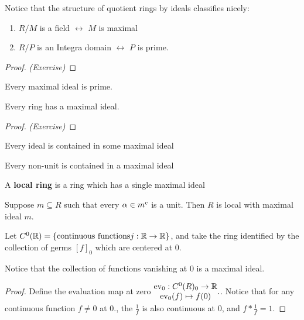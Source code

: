 \documentclass[12pt, twosided]{article}
\begin{document}
Notice that the structure of quotient rings by ideals classifies nicely:

\begin{thm}\label{Ex2} \hspace{0ex}
  \begin{enumerate}
  \item \(R/M\) is a field \(\longleftrightarrow\) \(M\) is maximal
  \item \(R/P\) is an Integra domain \(\longleftrightarrow\) \(P\) is prime.
  \end{enumerate}
\end{thm}
\begin{proof}
  {\color{red} \textit{(Exercise)}}
\end{proof}

\begin{note}
  Every maximal ideal is prime.
\end{note}

\begin{prop}
  Every ring has a maximal ideal.
\end{prop}
\begin{proof}
  {\color{red} \textit{(Exercise)}}
\end{proof}

\begin{cor}
  Every ideal is contained in some maximal ideal
\end{cor}

\begin{cor}
  Every non-unit is contained in a maximal ideal
\end{cor}

\begin{df}
  A \textbf{local ring} is a ring which has a single maximal ideal
\end{df}

\begin{prop}
  Suppose \(m \subseteq R\) such that every \(\alpha \in m^c\) is a unit. Then \(R\) is local with maximal ideal \(m\).
\end{prop}

\begin{exa}
  Let \(C^0(\mathbb{R}) = \left\{  \text{continuous functions} j: \mathbb{R} \to \mathbb{R} \right\}\), and take the ring identified by the collection of germs \([f]_0\) which are centered at \(0\).

  Notice that the collection of functions vanishing at \(0\) is a maximal ideal.
\end{exa}
\begin{proof}
  Define the evaluation map at zero \(
  \begin{matrix}
    \mathrm{ev}_0: C^0(R)_0 \to \mathbb{R} \\
    \mathrm{ev}_0(f) \mapsto f(0)
  \end{matrix}.
  \). Notice that for any continuous function \(f \neq 0\) at \(0\)., the \(\frac{1}{f}\) is also continuous at \(0\), and \(f * \frac{1}{f} = 1\).
\end{proof}
\end{document}
